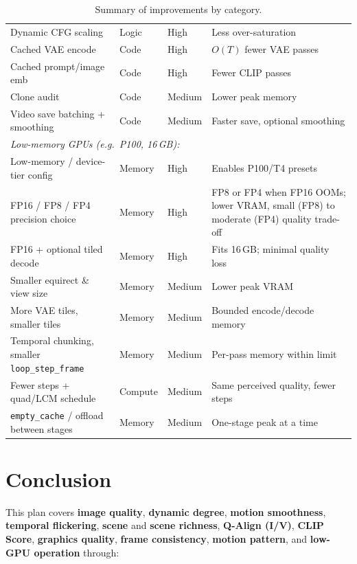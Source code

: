 \documentclass[11pt,a4paper]{article}
\newcommand{\fn}[1]{\texttt{#1}}
\begin{document}
\begin{table}[H]
\begin{tabular}{@{}p{}p{}p{}p{}@{}}
Dynamic CFG scaling & Logic & High & Less over-saturation \\
Cached VAE encode & Code & High & $O(T)$ fewer VAE passes \\
Cached prompt/image emb & Code & High & Fewer CLIP passes \\
Clone audit & Code & Medium & Lower peak memory \\
Video save batching + smoothing & Code & Medium & Faster save, optional smoothing \\
\midrule
\multicolumn{4}{l}{\textit{Low-memory GPUs (e.g.\ P100, 16\,GB):}} \\
Low-memory / device-tier config & Memory & High & Enables P100/T4 presets \\
FP16 / FP8 / FP4 precision choice & Memory & High & FP8 or FP4 when FP16 OOMs; lower VRAM, small (FP8) to moderate (FP4) quality trade-off \\
FP16 + optional tiled decode & Memory & High & Fits 16\,GB; minimal quality loss \\
Smaller equirect \& view size & Memory & Medium & Lower peak VRAM \\
More VAE tiles, smaller tiles & Memory & Medium & Bounded encode/decode memory \\
Temporal chunking, smaller \fn{loop\_step\_frame} & Memory & Medium & Per-pass memory within limit \\
Fewer steps + quad/LCM schedule & Compute & Medium & Same perceived quality, fewer steps \\
\fn{empty\_cache} / offload between stages & Memory & Medium & One-stage peak at a time \\
\bottomrule
\end{tabular}
\caption{Summary of improvements by category.}
\end{table}

\section{Conclusion}

This plan covers \textbf{image quality}, \textbf{dynamic degree}, \textbf{motion smoothness}, \textbf{temporal flickering}, \textbf{scene} and \textbf{scene richness}, \textbf{Q-Align (I/V)}, \textbf{CLIP Score}, \textbf{graphics quality}, \textbf{frame consistency}, \textbf{motion pattern}, and \textbf{low-GPU operation} through:
\end{document}
